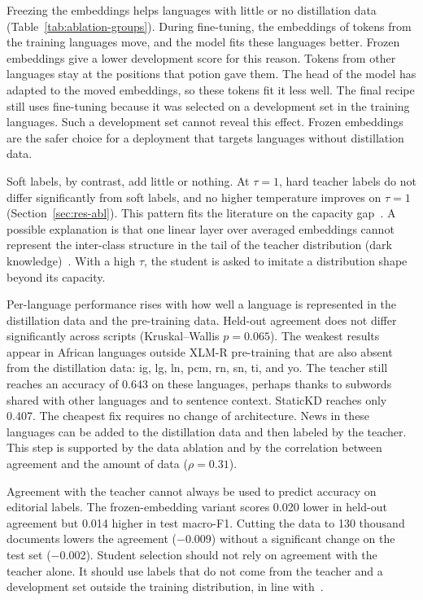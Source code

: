 \documentclass[journal]{IEEEtran}
\begin{document}
Freezing the embeddings helps languages with little or no distillation data (Table~\ref{tab:ablation-groups}). During fine-tuning, the embeddings of tokens from the training languages move, and the model fits these languages better. Frozen embeddings give a lower development score for this reason. Tokens from other languages stay at the positions that potion gave them. The head of the model has adapted to the moved embeddings, so these tokens fit it less well. The final recipe still uses fine-tuning because it was selected on a development set in the training languages. Such a development set cannot reveal this effect. Frozen embeddings are the safer choice for a deployment that targets languages without distillation data.

Soft labels, by contrast, add little or nothing. At $\tau=1$, hard teacher labels do not differ significantly from soft labels, and no higher temperature improves on $\tau=1$ (Section~\ref{sec:res-abl}). This pattern fits the literature on the capacity gap~\cite{zhang2025law,wang2026rckd}. A possible explanation is that one linear layer over averaged embeddings cannot represent the inter-class structure in the tail of the teacher distribution (dark knowledge)~\cite{zhao2022dkd}. With a high $\tau$, the student is asked to imitate a distribution shape beyond its capacity.

Per-language performance rises with how well a language is represented in the distillation data and the pre-training data. Held-out agreement does not differ significantly across scripts (Kruskal--Wallis $p=0.065$). The weakest results appear in African languages outside XLM-R pre-training that are also absent from the distillation data: ig, lg, ln, pcm, rn, sn, ti, and yo. The teacher still reaches an accuracy of 0.643 on these languages, perhaps thanks to subwords shared with other languages and to sentence context. StaticKD reaches only 0.407. The cheapest fix requires no change of architecture. News in these languages can be added to the distillation data and then labeled by the teacher. This step is supported by the data ablation and by the correlation between agreement and the amount of data ($\rho=0.31$).

Agreement with the teacher cannot always be used to predict accuracy on editorial labels. The frozen-embedding variant scores 0.020 lower in held-out agreement but 0.014 higher in test macro-F1. Cutting the data to 130 thousand documents lowers the agreement ($-$0.009) without a significant change on the test set ($-$0.002). Student selection should not rely on agreement with the teacher alone. It should use labels that do not come from the teacher and a development set outside the training distribution, in line with~\cite{stanton2021kd}.
\end{document}
